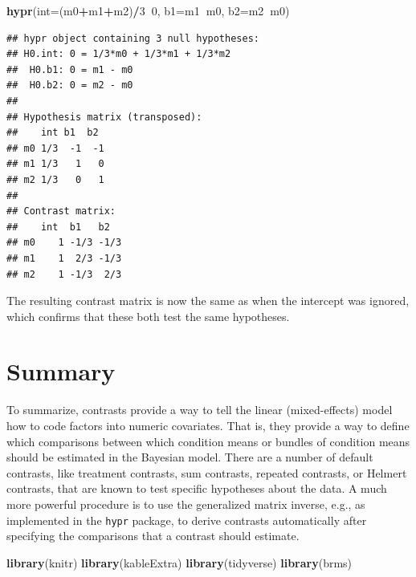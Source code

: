 \documentclass[12pt,]{krantz}
\newenvironment{Shaded}{\begin{snugshade}}{\end{snugshade}}
\newcommand{\DataTypeTok}[1]{\textcolor[rgb]{0.13,0.29,0.53}{#1}}
\newcommand{\DecValTok}[1]{\textcolor[rgb]{0.00,0.00,0.81}{#1}}
\newcommand{\KeywordTok}[1]{\textcolor[rgb]{0.13,0.29,0.53}{\textbf{#1}}}
\newcommand{\NormalTok}[1]{#1}
\newcommand{\OperatorTok}[1]{\textcolor[rgb]{0.81,0.36,0.00}{\textbf{#1}}}
\begin{document}
\begin{Shaded}
\begin{Highlighting}[]
\KeywordTok{hypr}\NormalTok{(}\DataTypeTok{int=}\NormalTok{(m0}\OperatorTok{+}\NormalTok{m1}\OperatorTok{+}\NormalTok{m2)}\OperatorTok{/}\DecValTok{3}\OperatorTok{~}\DecValTok{0}\NormalTok{, }\DataTypeTok{b1=}\NormalTok{m1}\OperatorTok{~}\NormalTok{m0, }\DataTypeTok{b2=}\NormalTok{m2}\OperatorTok{~}\NormalTok{m0)}
\end{Highlighting}
\end{Shaded}

\begin{verbatim}
## hypr object containing 3 null hypotheses:
## H0.int: 0 = 1/3*m0 + 1/3*m1 + 1/3*m2
##  H0.b1: 0 = m1 - m0
##  H0.b2: 0 = m2 - m0
## 
## Hypothesis matrix (transposed):
##    int b1  b2 
## m0 1/3  -1  -1
## m1 1/3   1   0
## m2 1/3   0   1
## 
## Contrast matrix:
##    int  b1   b2  
## m0    1 -1/3 -1/3
## m1    1  2/3 -1/3
## m2    1 -1/3  2/3
\end{verbatim}

The resulting contrast matrix is now the same as when the intercept was ignored, which confirms that these both test the same hypotheses.

\hypertarget{summary-1}{%
\section{Summary}\label{summary-1}}

To summarize, contrasts provide a way to tell the linear (mixed-effects) model how to code factors into numeric covariates. That is, they provide a way to define which comparisons between which condition means or bundles of condition means should be estimated in the Bayesian model. There are a number of default contrasts, like treatment contrasts, sum contrasts, repeated contrasts, or Helmert contrasts, that are known to test specific hypotheses about the data. A much more powerful procedure is to use the generalized matrix inverse, e.g., as implemented in the \texttt{hypr} package, to derive contrasts automatically after specifying the comparisons that a contrast should estimate.

\begin{Shaded}
\begin{Highlighting}[]
\KeywordTok{library}\NormalTok{(knitr)}
\KeywordTok{library}\NormalTok{(kableExtra)}
\KeywordTok{library}\NormalTok{(tidyverse)}
\KeywordTok{library}\NormalTok{(brms)}
\end{Highlighting}
\end{Shaded}
\end{document}
